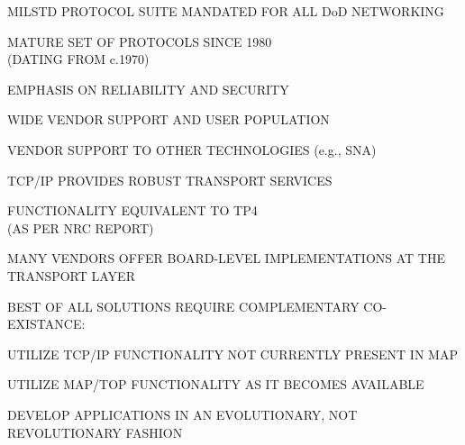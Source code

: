 \begin{bwslide}

\begin{nrtc}
\item	MILSTD PROTOCOL SUITE MANDATED FOR ALL DoD NETWORKING
    \begin{nrtc}
    \item	MATURE SET OF PROTOCOLS SINCE 1980\\ (DATING FROM c.1970)
    \item	EMPHASIS ON RELIABILITY AND SECURITY
    \item	WIDE VENDOR SUPPORT AND USER POPULATION
    \item	VENDOR SUPPORT TO OTHER TECHNOLOGIES (e.g., SNA)
    \end{nrtc}
\end{nrtc}
\end{bwslide}


\begin{bwslide}

\begin{nrtc}
\item	TCP/IP PROVIDES ROBUST TRANSPORT SERVICES
    \begin{nrtc}
    \item	FUNCTIONALITY EQUIVALENT TO TP4\\ (AS PER NRC REPORT)
    \item	MANY VENDORS OFFER BOARD-LEVEL IMPLEMENTATIONS AT THE
		TRANSPORT LAYER
    \end{nrtc}
\end{nrtc}
\end{bwslide}


\begin{bwslide}

\begin{nrtc}
\item	BEST OF ALL SOLUTIONS REQUIRE COMPLEMENTARY CO-EXISTANCE:
    \begin{nrtc}
    \item	UTILIZE TCP/IP FUNCTIONALITY NOT CURRENTLY PRESENT IN MAP
    \item	UTILIZE MAP/TOP FUNCTIONALITY AS IT BECOMES AVAILABLE
    \item	DEVELOP APPLICATIONS IN AN EVOLUTIONARY,
		NOT REVOLUTIONARY FASHION
    \end{nrtc}
\end{nrtc}
\end{bwslide}


